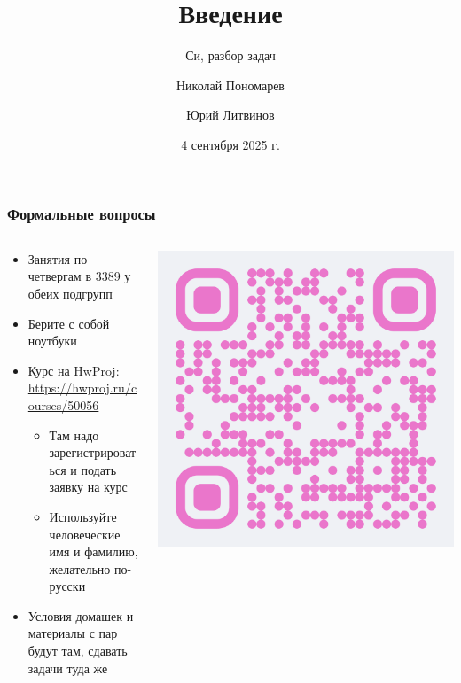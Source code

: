 \documentclass[aspectratio=169]{beamer}
\title{Введение}
\subtitle{Си, разбор задач}
\author{Николай Пономарев \and Юрий Литвинов}
\date{4 сентября 2025 г.}
\begin{document}
\begin{frame}
    \titlepage
\end{frame}

\begin{frame}
    \frametitle{Формальные вопросы}
    \begin{columns}
        \begin{column}{0.65\linewidth}
            \begin{itemize}
                \item Занятия по четвергам в 3389 у обеих подгрупп
                \item Берите с собой ноутбуки
                \item Курс на HwProj: \url{https://hwproj.ru/courses/50056}
                      \begin{itemize}
                          \item Там надо зарегистрироваться и подать заявку на курс
                          \item Используйте человеческие имя и фамилию, желательно по-русски
                      \end{itemize}
                \item Условия домашек и материалы с пар будут там, сдавать задачи туда же

            \end{itemize}
        \end{column}
        \begin{column}{0.3\linewidth}
            \includegraphics[width=0.95\linewidth]{hwproj.pdf}
        \end{column}
    \end{columns}

\end{frame}
\end{document}
